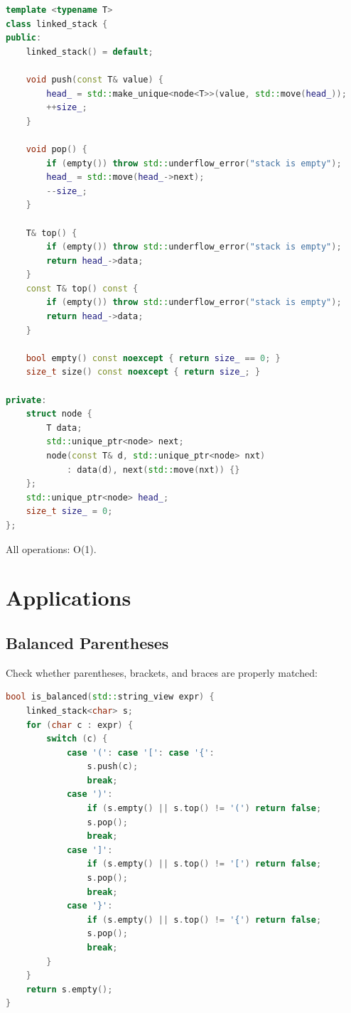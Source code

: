 \begin{lstlisting}[language=C++]
template <typename T>
class linked_stack {
public:
    linked_stack() = default;

    void push(const T& value) {
        head_ = std::make_unique<node<T>>(value, std::move(head_));
        ++size_;
    }

    void pop() {
        if (empty()) throw std::underflow_error("stack is empty");
        head_ = std::move(head_->next);
        --size_;
    }

    T& top() {
        if (empty()) throw std::underflow_error("stack is empty");
        return head_->data;
    }
    const T& top() const {
        if (empty()) throw std::underflow_error("stack is empty");
        return head_->data;
    }

    bool empty() const noexcept { return size_ == 0; }
    size_t size() const noexcept { return size_; }

private:
    struct node {
        T data;
        std::unique_ptr<node> next;
        node(const T& d, std::unique_ptr<node> nxt)
            : data(d), next(std::move(nxt)) {}
    };
    std::unique_ptr<node> head_;
    size_t size_ = 0;
};
\end{lstlisting}

All operations: O(1).

\section{Applications}

\subsection{Balanced Parentheses}

Check whether parentheses, brackets, and braces are properly matched:

\begin{lstlisting}[language=C++]
bool is_balanced(std::string_view expr) {
    linked_stack<char> s;
    for (char c : expr) {
        switch (c) {
            case '(': case '[': case '{':
                s.push(c);
                break;
            case ')':
                if (s.empty() || s.top() != '(') return false;
                s.pop();
                break;
            case ']':
                if (s.empty() || s.top() != '[') return false;
                s.pop();
                break;
            case '}':
                if (s.empty() || s.top() != '{') return false;
                s.pop();
                break;
        }
    }
    return s.empty();
}
\end{lstlisting}

